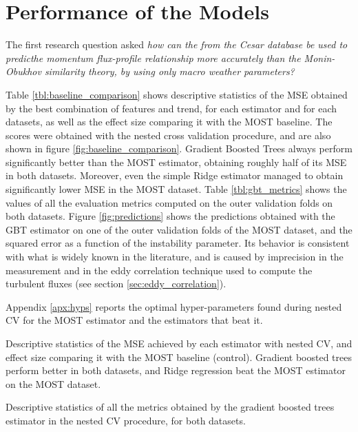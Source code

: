 \documentclass[a4paper,11pt]{kth-mag}
\begin{document}
 \section{Performance of the Models}
\label{sec:model_perf}
The first research question asked \emph{how can the from the Cesar database be used to predicthe momentum flux-profile relationship more accurately than the Monin-Obukhov similarity theory, by using only macro weather parameters?}

Table \ref{tbl:baseline_comparison} shows descriptive statistics of the MSE obtained by the best combination of features and trend, for each estimator and for each datasets, as well as the effect size comparing it with the MOST baseline. The scores were obtained with the nested cross validation procedure, and are also shown in figure \ref{fig:baseline_comparison}. Gradient Boosted Trees always perform significantly better than the MOST estimator, obtaining roughly half of its MSE in both datasets. Moreover, even the simple Ridge estimator managed to obtain significantly lower MSE in the MOST dataset. Table \ref{tbl:gbt_metrics} shows the values of all the evaluation metrics computed on the outer validation folds on both datasets. Figure \ref{fig:predictions} shows the predictions obtained with the GBT estimator on one of the outer validation folds of the MOST dataset, and the squared error as a function of the instability parameter. Its behavior is consistent with what is widely known in the literature, and is caused by imprecision in the measurement and in the eddy correlation technique used to compute the turbulent fluxes (see section \ref{sec:eddy_correlation}).

Appendix \ref{apx:hyps} reports the optimal hyper-parameters found during nested CV for the MOST estimator and the estimators that beat it.

\begin{table}
\caption{Descriptive statistics of the MSE achieved by each estimator with nested CV, and effect size comparing it with the MOST baseline (control). Gradient boosted trees perform better in both datasets, and Ridge regression beat the MOST estimator on the MOST dataset.}
\label{tbl:baseline_comparison}

\end{table}



\begin{table}
\caption{Descriptive statistics of all the metrics obtained by the gradient boosted trees estimator in the nested CV procedure, for both datasets.}
\label{tbl:gbt_metrics}

\end{table}
\end{document}
